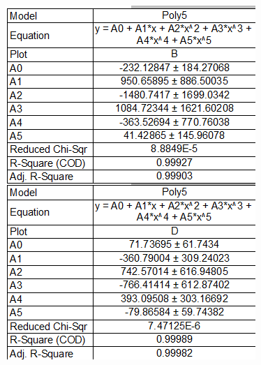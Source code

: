 \documentclass[a4paper, 12pt]{article}
\begin{document}
	\begin{figure}[H]
	\begin{center}
	\includegraphics[width=\textwidth]{image2.png}
	\end{center}
	\end{figure}
\end{document}
